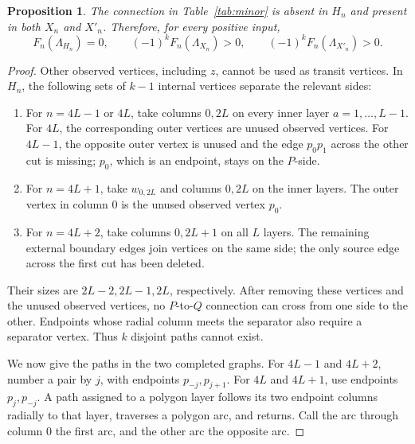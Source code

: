 \documentclass[11pt]{article}
\newtheorem{proposition}[theorem]{Proposition}
\theoremstyle{definition}
\begin{document}
\begin{proposition}
\label{prop:connection}
The connection in Table~\ref{tab:minor} is absent in \(H_n\) and present
in both \(X_n\) and \(X'_n\). Therefore, for every positive input,
\begin{equation}
 F_n(\Lambda_{H_n})=0,\qquad
 (-1)^kF_n(\Lambda_{X_n})>0,\qquad
 (-1)^kF_n(\Lambda_{X'_n})>0.
 \label{eq:connection-signs}
\end{equation}
\end{proposition}
\begin{proof}
Other observed vertices, including \(z\), cannot be used as transit
vertices. In \(H_n\), the following sets of \(k-1\) internal vertices
separate the relevant sides:
\begin{enumerate}
\item For \(n=4L-1\) or \(4L\), take columns \(0,2L\) on every
inner layer \(a=1,\ldots,L-1\).
For \(4L\), the corresponding outer vertices are unused observed
vertices. For \(4L-1\), the opposite outer vertex is unused and the
edge \(p_0p_1\) across the other cut is missing; \(p_0\), which is an
endpoint, stays on the \(P\)-side.
\item For \(n=4L+1\), take \(w_{0,2L}\) and columns \(0,2L\)
on the inner layers. The outer vertex in column 0 is the unused
observed vertex \(p_0\).
\item For \(n=4L+2\), take columns \(0,2L+1\) on all \(L\) layers.
The remaining external boundary edges join vertices on the same side;
the only source edge across the first cut has been deleted.
\end{enumerate}
Their sizes are \(2L-2,2L-1,2L\), respectively. After removing these
vertices and the unused observed vertices, no \(P\)-to-\(Q\) connection
can cross from one side to the other. Endpoints whose radial column
meets the separator also require a separator vertex. Thus \(k\)
disjoint paths cannot exist.

We now give the paths in the two completed graphs.
For \(4L-1\) and \(4L+2\), number a pair by \(j\), with endpoints
\(p_{-j},p_{j+1}\). For \(4L\) and \(4L+1\), use endpoints \(p_j,p_{-j}\).
A path assigned to a polygon layer follows its two endpoint columns
radially to that layer, traverses a polygon arc, and returns.
Call the arc through column 0 the first arc, and the other arc the
opposite arc.


\end{proof}
\end{document}
